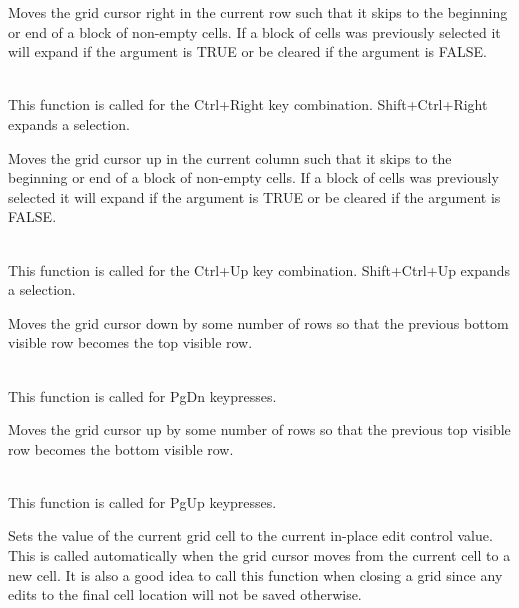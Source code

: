 Moves the grid cursor right in the current row such that it skips to the beginning or
end of a block of non-empty cells. If a block of cells was previously selected it
will expand if the argument is TRUE or be cleared if the argument is FALSE.

\\
This function is called for the Ctrl+Right key combination. Shift+Ctrl+Right expands a selection.

\label{wxgridmovecursorupblock}


Moves the grid cursor up in the current column such that it skips to the beginning or
end of a block of non-empty cells. If a block of cells was previously selected it
will expand if the argument is TRUE or be cleared if the argument is FALSE.

\\
This function is called for the Ctrl+Up key combination. Shift+Ctrl+Up expands a selection.

\label{wxgridmovepagedown}


Moves the grid cursor down by some number of rows so that the previous bottom visible row
becomes the top visible row.

\\
This function is called for PgDn keypresses.

\label{wxgridmovepageup}


Moves the grid cursor up by some number of rows so that the previous top visible row
becomes the bottom visible row.

\\
This function is called for PgUp keypresses.

\label{wxgridsaveeditcontrolvalue}


Sets the value of the current grid cell to the current in-place edit control value.
This is called automatically when the grid cursor moves from the current cell to a
new cell. It is also a good idea to call this function when closing a grid since
any edits to the final cell location will not be saved otherwise.

